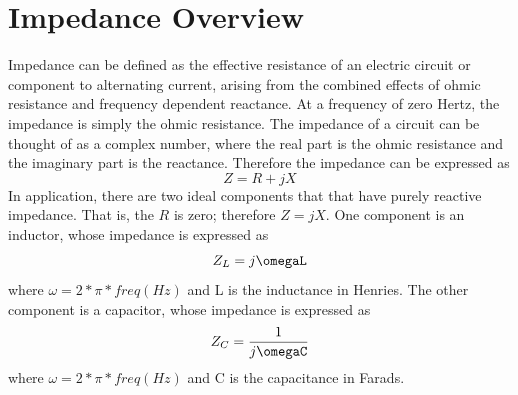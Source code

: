 \documentclass[]{IEEEtran}
\begin{document}
\section{Impedance Overview}
Impedance can be defined as the effective resistance of an electric circuit or component to alternating current, arising from the combined effects of ohmic resistance and frequency dependent reactance. At a frequency of zero Hertz, the impedance is simply the ohmic resistance. The impedance of a circuit can be thought of as a complex number, where the real part is the ohmic resistance and the imaginary part is the reactance. Therefore the impedance can be expressed as \[Z=R+jX\]In application, there are two ideal components that that have purely reactive impedance. That is, the \(R\) is zero; therefore \(Z=jX\). One component is an inductor, whose impedance is expressed as \[Z_L=j\omegaL\] where \(\omega=2*\pi*freq(Hz)\) and L is the inductance in Henries. The other component is a capacitor, whose impedance is expressed as \[Z_C=\frac{1}{j\omegaC}\] where \(\omega=2*\pi*freq(Hz)\) and C is the capacitance in Farads.\newline
\end{document}
